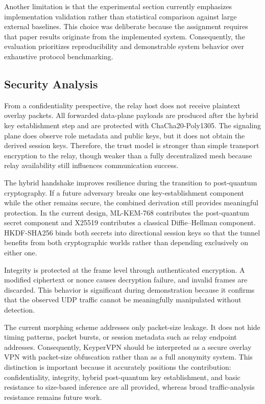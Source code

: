 \documentclass[conference]{IEEEtran}
\begin{document}
Another limitation is that the experimental section currently emphasizes implementation validation rather than statistical comparison against large external baselines. This choice was deliberate because the assignment requires that paper results originate from the implemented system. Consequently, the evaluation prioritizes reproducibility and demonstrable system behavior over exhaustive protocol benchmarking.

\subsection{Security Analysis}
From a confidentiality perspective, the relay host does not receive plaintext overlay packets. All forwarded data-plane payloads are produced after the hybrid key establishment step and are protected with ChaCha20-Poly1305. The signaling plane does observe role metadata and public keys, but it does not obtain the derived session keys. Therefore, the trust model is stronger than simple transport encryption to the relay, though weaker than a fully decentralized mesh because relay availability still influences communication success.

The hybrid handshake improves resilience during the transition to post-quantum cryptography. If a future adversary breaks one key-establishment component while the other remains secure, the combined derivation still provides meaningful protection. In the current design, ML-KEM-768 contributes the post-quantum secret component and X25519 contributes a classical Diffie--Hellman component. HKDF-SHA256 binds both secrets into directional session keys so that the tunnel benefits from both cryptographic worlds rather than depending exclusively on either one.

Integrity is protected at the frame level through authenticated encryption. A modified ciphertext or nonce causes decryption failure, and invalid frames are discarded. This behavior is significant during demonstration because it confirms that the observed UDP traffic cannot be meaningfully manipulated without detection.

The current morphing scheme addresses only packet-size leakage. It does not hide timing patterns, packet bursts, or session metadata such as relay endpoint addresses. Consequently, KeyperVPN should be interpreted as a secure overlay VPN with packet-size obfuscation rather than as a full anonymity system. This distinction is important because it accurately positions the contribution: confidentiality, integrity, hybrid post-quantum key establishment, and basic resistance to size-based inference are all provided, whereas broad traffic-analysis resistance remains future work.
\end{document}
